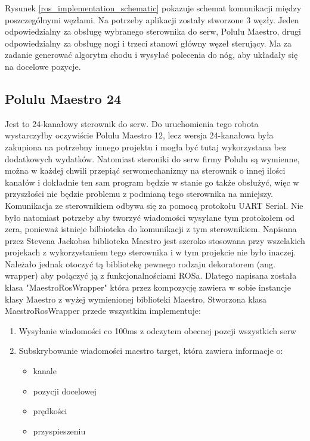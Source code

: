 \documentclass[a4paper,13pt]{article}
\begin{document}
Rysunek \ref{ros_implementation_schematic} pokazuje schemat komunikacji między poszczególnymi węzłami. Na potrzeby aplikacji zostały stworzone 3 węzły. Jeden odpowiedzialny za obsługę wybranego sterownika do serw, Polulu Maestro, drugi odpowiedzialny za obsługę nogi i trzeci stanowi główny węzeł sterujący. Ma za zadanie generować algorytm chodu i wysyłać polecenia do nóg, aby układały się na docelowe pozycje.
\subsection{Polulu Maestro 24}
Jest to 24-kanałowy sterownik do serw. Do uruchomienia tego robota wystarczyłby oczywiście Polulu Maestro 12, lecz wersja 24-kanałowa była zakupiona na potrzebny innego projektu i mogła być tutaj wykorzystana bez dodatkowych wydatków. Natomiast steroniki do serw firmy Polulu są wymienne, można w każdej chwili przepiąć serwomechanizmy na sterownik o innej ilości kanałów i dokładnie ten sam program będzie w stanie go także obsłużyć, więc w przyszłości nie będzie problemu z podmianą tego sterownika na mniejszy.\\

Komunikacja ze sterownikiem odbywa się za pomocą protokołu UART Serial. Nie było natomiast potrzeby aby tworzyć wiadomości wysyłane tym protokołem od zera, ponieważ istnieje bilbioteka do komunikacji z tym sterownikiem. Napisana przez Stevena Jackobsa biblioteka Maestro \cite{maestro_pylib} jest szeroko stosowana przy wszelakich projekach z wykorzystaniem tego sterownika i w tym projekcie nie było inaczej. Należało jednak otoczyć tą bibliotekę pewnego rodzaju dekoratorem (ang. wrapper) aby połączyć ją z funkcjonalnościami ROSa. Dlatego napisana została klasa "MaestroRosWrapper" która przez kompozycję zawiera w sobie instancje klasy Maestro z wyżej wymienionej biblioteki Maestro. Stworzona klasa MaestroRosWrapper przede wszystkim implementuje:
\begin{enumerate}
\item Wysyłanie wiadomości co 100ms z odczytem obecnej pozcji wszystkich serw
\item Subskrybowanie wiadomości maestro target, która zawiera informacje o:
\begin{itemize}
\item kanale 
\item pozycji docelowej
\item prędkości
\item przyspieszeniu
\end{itemize}
\end{enumerate}
\end{document}

